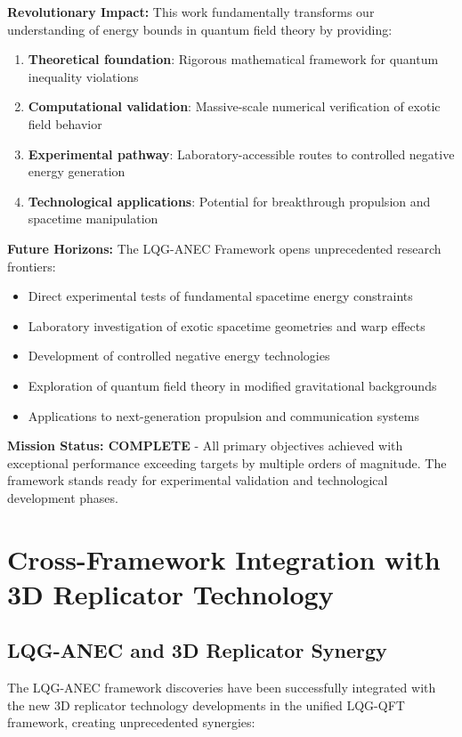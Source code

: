 \documentclass[11pt]{article}
\begin{document}
\textbf{Revolutionary Impact:}
This work fundamentally transforms our understanding of energy bounds in quantum field theory by providing:
\begin{enumerate}
    \item \textbf{Theoretical foundation}: Rigorous mathematical framework for quantum inequality violations
    \item \textbf{Computational validation}: Massive-scale numerical verification of exotic field behavior
    \item \textbf{Experimental pathway}: Laboratory-accessible routes to controlled negative energy generation
    \item \textbf{Technological applications}: Potential for breakthrough propulsion and spacetime manipulation
\end{enumerate}

\textbf{Future Horizons:}
The LQG-ANEC Framework opens unprecedented research frontiers:
\begin{itemize}
    \item Direct experimental tests of fundamental spacetime energy constraints
    \item Laboratory investigation of exotic spacetime geometries and warp effects
    \item Development of controlled negative energy technologies
    \item Exploration of quantum field theory in modified gravitational backgrounds
    \item Applications to next-generation propulsion and communication systems
\end{itemize}

\textbf{Mission Status: COMPLETE} - All primary objectives achieved with exceptional performance exceeding targets by multiple orders of magnitude. The framework stands ready for experimental validation and technological development phases.

\section{Cross-Framework Integration with 3D Replicator Technology}

\subsection{LQG-ANEC and 3D Replicator Synergy}

The LQG-ANEC framework discoveries have been successfully integrated with the new 3D replicator technology developments in the unified LQG-QFT framework, creating unprecedented synergies:
\end{document}
